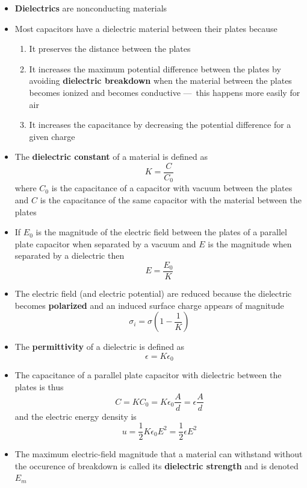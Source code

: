 \documentclass{article}
\begin{document}
\begin{itemize}
  \item \textbf{Dielectrics} are nonconducting materials

  \item Most capacitors have a dielectric material between their plates because

        \begin{enumerate}
          \item It preserves the distance between the plates

          \item It increases the maximum potential difference between the plates by avoiding \textbf{dielectric breakdown} when the material between the plates becomes ionized and becomes conductive — this happens more easily for air

          \item It increases the capacitance by decreasing the potential difference for a given charge
        \end{enumerate}

  \item The \textbf{dielectric constant} of a material is defined as \[K = \frac{C}{C_0}\] where $C_0$ is the capacitance of a capacitor with vacuum between the plates and $C$ is the capacitance of the same capacitor with the material between the plates

  \item If $E_0$ is the magnitude of the electric field between the plates of a parallel plate capacitor when separated by a vacuum and $E$ is the magnitude when separated by a dielectric then \[E = \frac{E_0}{K}\]

  \item The electric field (and electric potential) are reduced because the dielectric becomes \textbf{polarized} and an induced surface charge appears of magnitude \[\sigma_i = \sigma \left( 1 - \frac{1}{K} \right)\]

  \item The \textbf{permittivity} of a dielectric is defined as \[\epsilon = K \epsilon_0\]

  \item The capacitance of a parallel plate capacitor with dielectric between the plates is thus \[C = K C_0 = K \epsilon_0 \frac{A}{d} = \epsilon \frac{A}{d}\] and the electric energy density is \[u = \frac{1}{2} K \epsilon_0 E^2 = \frac{1}{2} \epsilon E^2\]

  \item The maximum electric-field magnitude that a material can withstand without the occurence of breakdown is called its \textbf{dielectric strength} and is denoted $E_m$
\end{itemize}
\end{document}
